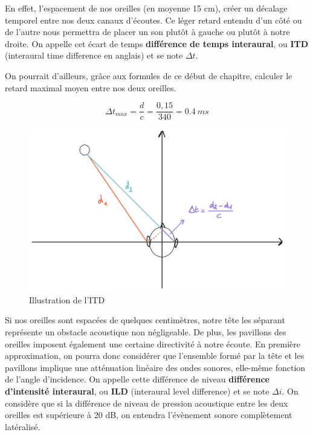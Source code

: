 \documentclass[
]{book}
\begin{document}
En effet, l'espacement de nos oreilles (en moyenne 15 cm), créer un décalage temporel entre nos deux canaux d'écoutes. Ce léger retard entendu d'un côté ou de l'autre nous permettra de placer un son plutôt à gauche ou plutôt à notre droite. On appelle cet écart de temps \textbf{différence de temps interaural}, ou \textbf{ITD} (interaural time difference en anglais) et se note \(\Delta t\).

On pourrait d'ailleurs, grâce aux formules de ce début de chapitre, calculer le retard maximal moyen entre nos deux oreilles.

\[\Delta t_{max} = \frac d c = \frac {0,15}{340} = 0.4 \> ms\]

\begin{figure}

{\centering \includegraphics{_resources/drawings/delta_t} 

}

\caption{Illustration de l'ITD}\label{fig:unnamed-chunk-8}
\end{figure}

Si nos oreilles sont espacées de quelques centimètres, notre tête les séparant représente un obstacle acoustique non négligeable. De plus, les pavillons des oreilles imposent également une certaine directivité à notre écoute. En première approximation, on pourra donc considérer que l'ensemble formé par la tête et les pavillons implique une atténuation linéaire des ondes sonores, elle-même fonction de l'angle d'incidence. On appelle cette différence de niveau \textbf{différence d'intensité interaural}, ou \textbf{ILD} (interaural level difference) et se note \(\Delta i\). On considère que si la différence de niveau de pression acoustique entre les deux oreilles est supérieure à 20 dB, on entendra l'évènement sonore complètement latéralisé.
\end{document}

